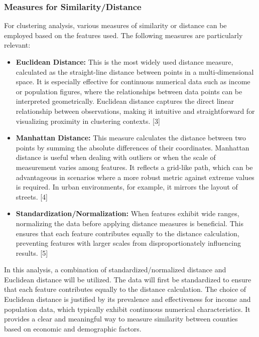 \documentclass[
]{article}
\providecommand{\tightlist}{%
  \setlength{\itemsep}{0pt}\setlength{\parskip}{0pt}}
\begin{document}
\subsubsection{Measures for
Similarity/Distance}\label{measures-for-similaritydistance}

For clustering analysis, various measures of similarity or distance can
be employed based on the features used. The following measures are
particularly relevant:

\begin{itemize}
\tightlist
\item
  \textbf{Euclidean Distance:} This is the most widely used distance
  measure, calculated as the straight-line distance between points in a
  multi-dimensional space. It is especially effective for continuous
  numerical data such as income or population figures, where the
  relationships between data points can be interpreted geometrically.
  Euclidean distance captures the direct linear relationship between
  observations, making it intuitive and straightforward for visualizing
  proximity in clustering contexts. {[}3{]}
\item
  \textbf{Manhattan Distance:} This measure calculates the distance
  between two points by summing the absolute differences of their
  coordinates. Manhattan distance is useful when dealing with outliers
  or when the scale of measurement varies among features. It reflects a
  grid-like path, which can be advantageous in scenarios where a more
  robust metric against extreme values is required. In urban
  environments, for example, it mirrors the layout of streets. {[}4{]}
\item
  \textbf{Standardization/Normalization:} When features exhibit wide
  ranges, normalizing the data before applying distance measures is
  beneficial. This ensures that each feature contributes equally to the
  distance calculation, preventing features with larger scales from
  disproportionately influencing results. {[}5{]}
\end{itemize}

In this analysis, a combination of standardized/normalized distance and
Euclidean distance will be utilized. The data will first be standardized
to ensure that each feature contributes equally to the distance
calculation. The choice of Euclidean distance is justified by its
prevalence and effectiveness for income and population data, which
typically exhibit continuous numerical characteristics. It provides a
clear and meaningful way to measure similarity between counties based on
economic and demographic factors.
\end{document}
